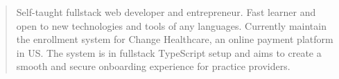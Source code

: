 \documentclass[10pt,a4paper,ragged2e,withhyper]{altacv}
\begin{document}
\begin{paracol}{2}
        
        
        \newpage
        
        \switchcolumn
        
            \begin{quote}
                Self-taught fullstack web developer and entrepreneur. Fast learner and open to new technologies and tools of any languages. Currently maintain the enrollment system for Change Healthcare, an online payment platform in US. The system is in fullstack TypeScript setup and aims to create a smooth and secure onboarding experience for practice providers.
            \end{quote}
        

\end{paracol}
\end{document}
